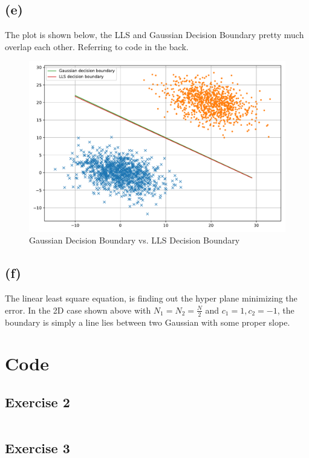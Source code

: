 \documentclass[11pt]{article}
\begin{document}
\subsection*{(e)}
\noindent The plot is shown below, the LLS and Gaussian Decision Boundary pretty much overlap each other. Referring to code in the back.
\begin{figure}[h]
	\centering
	\includegraphics[width=0.8\linewidth]{exercise3_e}
	\caption{Gaussian Decision Boundary vs. LLS Decision Boundary}
\end{figure}

\subsection*{(f)}
\noindent The linear least square equation, is finding out the hyper plane minimizing the error.	In the 2D case shown above with $N_1 = N_2 = \frac{N}{2}$ and $c_1 = 1, c_2=-1$, the boundary is simply a line lies between two Gaussian with some proper slope.

\section*{Code}
\subsection*{Exercise 2}
\inputminted[breaklines]{python}{./py/exercise2.py}
\subsection*{Exercise 3}
\inputminted[breaklines]{python}{./py/exercise3.py}
\end{document}
